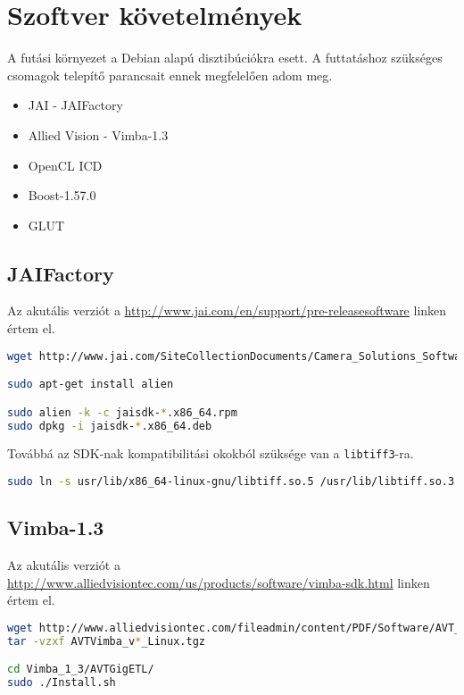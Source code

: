 \section{Szoftver követelmények}
A futási környezet a Debian alapú disztibúciókra esett. A futtatáshoz szükséges csomagok telepítő parancsait ennek megfelelően
adom meg.
\begin{itemize}[noitemsep]
	\item JAI - JAIFactory
	\item Allied Vision - Vimba-1.3
	\item OpenCL ICD
	\item Boost-1.57.0
	\item GLUT
\end{itemize}

\subsection*{JAIFactory}
	Az akutális verziót a \url{http://www.jai.com/en/support/pre-releasesoftware} linken értem el.

\begin{lstlisting}[language=bash]
wget http://www.jai.com/SiteCollectionDocuments/Camera_Solutions_Software/jaisdk-1.00-rc22.x86_64.rpm

sudo apt-get install alien

sudo alien -k -c jaisdk-*.x86_64.rpm
sudo dpkg -i jaisdk-*.x86_64.deb
\end{lstlisting}

	Továbbá az SDK-nak kompatibilitási okokból szüksége van a \texttt{libtiff3}-ra.
\begin{lstlisting}[language=bash]
sudo ln -s usr/lib/x86_64-linux-gnu/libtiff.so.5 /usr/lib/libtiff.so.3
\end{lstlisting}

\subsection*{Vimba-1.3}
	Az akutális verziót a \url{http://www.alliedvisiontec.com/us/products/software/vimba-sdk.html} linken értem el.

\begin{lstlisting}[language=bash]
wget http://www.alliedvisiontec.com/fileadmin/content/PDF/Software/AVT_software/zip_files/VIMBA/AVTVimba_v1.3_Linux.tgz
tar -vzxf AVTVimba_v*_Linux.tgz

cd Vimba_1_3/AVTGigETL/
sudo ./Install.sh
\end{lstlisting}

